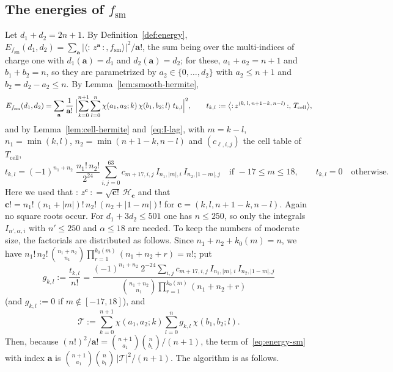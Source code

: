 \documentclass[11pt,reqno]{amsart}
\theoremstyle{definition}
\numberwithin{equation}{section}
\newcommand{\wick}[1]{{:}\,#1\,{:}}
\newcommand{\Tcell}{T_{\mathrm{cell}}}
\newcommand{\fsm}{f_{\mathrm{sm}}}
\begin{document}
\subsection{The energies of \texorpdfstring{$\fsm$}{f-sm}}\label{app:smooth}
Let $d_1+d_2=2n+1$. By Definition~\ref{def:energy}, $E_{\fsm}(d_1,d_2)=\sum_{\mathbf{a}}|\langle\wick{z^{\mathbf{a}}},\fsm\rangle|^2/\mathbf{a}!$, the sum being over the multi-indices of charge one with $d_1(\mathbf{a})=d_1$ and $d_2(\mathbf{a})=d_2$; for these, $a_1+a_2=n+1$ and $b_1+b_2=n$, so they are parametrized by $a_2\in\{0,\dots,d_2\}$ with $a_2\le n+1$ and $b_2=d_2-a_2\le n$. By Lemma~\ref{lem:smooth-hermite},
\begin{equation}\label{eq:energy-sm}
  E_{\fsm}(d_1,d_2)=\sum_{\mathbf{a}}\frac{1}{\mathbf{a}!}\;\Bigl|\sum_{k=0}^{n+1}\sum_{l=0}^{n}\chi(a_1,a_2;k)\,\chi(b_1,b_2;l)\ t_{k,l}\Bigr|^2,
  \qquad t_{k,l}:=\bigl\langle\wick{z^{(k,\,l,\,n+1-k,\,n-l)}},\,\Tcell\bigr\rangle ,
\end{equation}
and by Lemma~\ref{lem:cell-hermite} and~\eqref{eq:I-lag}, with $m=k-l$, $n_1=\min(k,l)$, $n_2=\min(n+1-k,n-l)$ and $(c_{\ell,i,j})$ the cell table of $\Tcell$,
\[
  t_{k,l}=(-1)^{n_1+n_2}\;\frac{n_1!\,n_2!}{2^{24}}\sum_{i,j=0}^{63}c_{m+17,i,j}\,I_{n_1,|m|,i}\,I_{n_2,|1-m|,j}\quad\text{if }-17\le m\le18,\qquad t_{k,l}=0\quad\text{otherwise.}
\]
Here we used that $\wick{z^{\mathbf{c}}}=\sqrt{\mathbf{c}!}\,\mathcal{H}_{\mathbf{c}}$ and that $\mathbf{c}!=n_1!\,(n_1+|m|)!\,n_2!\,(n_2+|1-m|)!$ for $\mathbf{c}=(k,l,n+1-k,n-l)$. Again no square roots occur. For $d_1+3d_2\le501$ one has $n\le250$, so only the integrals $I_{n',\alpha,i}$ with $n'\le250$ and $\alpha\le18$ are needed. To keep the numbers of moderate size, the factorials are distributed as follows. Since $n_1+n_2+k_0(m)=n$, we have $n_1!\,n_2!\,\binom{n_1+n_2}{n_1}\prod_{r=1}^{k_0(m)}(n_1+n_2+r)=n!$; put
\[
  g_{k,l}:=\frac{t_{k,l}}{n!}=\frac{(-1)^{n_1+n_2}\ 2^{-24}\sum_{i,j}c_{m+17,i,j}\,I_{n_1,|m|,i}\,I_{n_2,|1-m|,j}}{\binom{n_1+n_2}{n_1}\prod_{r=1}^{k_0(m)}(n_1+n_2+r)}
\]
(and $g_{k,l}:=0$ if $m\notin[-17,18]$), and
\[
  \mathcal{T}:=\sum_{k=0}^{n+1}\chi(a_1,a_2;k)\sum_{l=0}^{n}g_{k,l}\,\chi(b_1,b_2;l) .
\]
Then, because $(n!)^2/\mathbf{a}!=\binom{n+1}{a_1}\binom{n}{b_1}/(n+1)$, the term of~\eqref{eq:energy-sm} with index $\mathbf{a}$ is $\binom{n+1}{a_1}\binom{n}{b_1}\,|\mathcal{T}|^2/(n+1)$. The algorithm is as follows.
\end{document}
